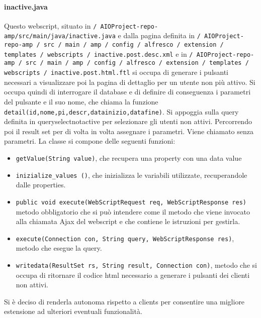 \paragraph{inactive.java}
Questo webscript, situato in \texttt{/ AIOProject-repo-amp/src/main/java/inactive.java} e dalla pagina definita in \texttt{/ AIOProject-repo-amp / src / main / amp / config / alfresco / extension / templates / webscripts / inactive.post.desc.xml} e in \texttt{/ AIOProject-repo-amp / src / main / amp / config / alfresco / extension / templates / webscripts / inactive.post.html.ftl} si occupa di generare i pulsanti necessari a visualizzare poi la pagina di dettaglio per un utente non più attivo. Si occupa quindi di interrogare il database e di definire di conseguenza i parametri del pulsante e il suo nome, che chiama la funzione \texttt{detail(id,nome,pi,descr,datainizio,datafine)}. Si appoggia sulla query definita in queryselectnotactive per selezionare gli utenti non attivi. Percorrendo poi il result set per di volta in volta assegnare i parametri.
Viene chiamato senza parametri.
La classe si compone delle seguenti funzioni:
\begin{itemize}
\item \texttt{getValue(String value)}, che recupera una property con una data value
\item \texttt{inizialize\_values ()}, che inizializza le variabili utilizzate, recuperandole dalle properties.
\item \texttt{public void execute(WebScriptRequest req, WebScriptResponse res)} metodo obbligatorio che si può intendere come il metodo che viene invocato alla chiamata Ajax del webscript e che contiene le istruzioni per gestirla.
\item \texttt{execute(Connection con, String query, WebScriptResponse res)}, metodo che esegue la query.
\item \texttt{writedata(ResultSet rs, String result, Connection con)}, metodo che si occupa di ritornare il codice html necessario a generare i pulsanti dei clienti non attivi.
\end{itemize}
Si è deciso di renderla autonoma rispetto a clients per consentire una migliore estensione ad ulteriori eventuali funzionalità.
